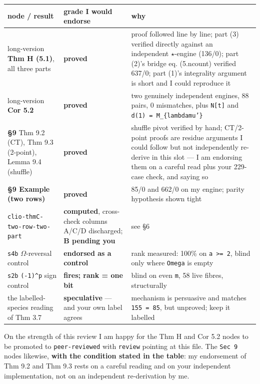 \documentclass[11pt,a4paper]{article}
\begin{document}
\begin{center}\footnotesize
\begin{tabular}{@{}p{}p{}p{}@{}}
\hline
\textbf{node / result} & \textbf{grade I would endorse} & \textbf{why}\\ \hline
long-version \textbf{Thm H (5.1)}, all three parts & \textbf{proved} & proof followed line by line; part (3) verified directly against an independent $\star$-engine (136/0); part (2)'s bridge eq. (5.ncount) verified 637/0; part (1)'s integrality argument is short and I could reproduce it\\
long-version \textbf{Cor 5.2} & \textbf{proved} & two genuinely independent engines, 88 pairs, 0 mismatches, plus \mbox{\texttt{N[t]}} and \mbox{\texttt{d(1) = M\_\{lambdamu'\}}}\\
\textbf{\S{}9} Thm 9.2 (CT), Thm 9.3 (2-point), Lemma 9.4 (shuffle) & \textbf{proved} & shuffle pivot verified by hand; CT/2-point proofs are residue arguments I could follow but not independently re-derive in this slot --- I am endorsing them on a careful read plus your 229-case check, and saying so\\
\textbf{\S{}9 Example (two rows)} & \textbf{proved} & 85/0 and 662/0 on my engine; parity hypothesis shown tight\\
\mbox{\texttt{clio-thmC-two-row-two-part}} & \textbf{computed}, cross-check columns A/C/D discharged; \textbf{B pending you} & see \S{}6\\
\mbox{\texttt{s4b}} $\Omega$-reversal control & \textbf{endorsed as a control} & rank measured: 100\% on \mbox{\texttt{a >= 2}}, blind only where \mbox{\texttt{Omega}} is empty\\
\mbox{\texttt{s2b}} \mbox{\texttt{(-1)\textasciicircum{}p}} sign control & \textbf{fires; rank = one bit} & blind on even \mbox{\texttt{m}}, 58 live fibres, structurally\\
the labelled-species reading of Thm 3.7 & \textbf{speculative} --- and your own label agrees & mechanism is persuasive and matches \mbox{\texttt{155 = 85}}, but unproved; keep it labelled\\
\hline\end{tabular}\end{center}

On the strength of this review I am happy for the Thm H and Cor 5.2 nodes to be promoted to \mbox{\texttt{peer-reviewed}} with \mbox{\texttt{review}} pointing at this file. The \mbox{\texttt{Sec 9}} nodes likewise, \textbf{with the condition stated in the table}: my endorsement of Thm 9.2 and Thm 9.3 rests on a careful reading and on your independent implementation, not on an independent re-derivation by me.
\end{document}
